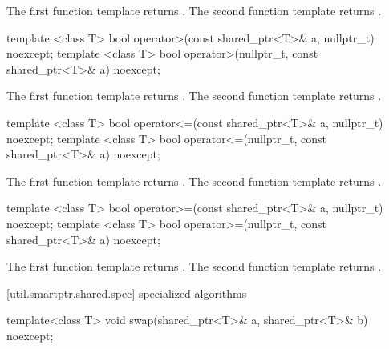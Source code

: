 \begin{itemdescr}
\pnum
\returns
The first function template returns
.
The second function template returns
.
\end{itemdescr}

%
\begin{itemdecl}
template <class T>
  bool operator>(const shared_ptr<T>& a, nullptr_t) noexcept;
template <class T>
  bool operator>(nullptr_t, const shared_ptr<T>& a) noexcept;
\end{itemdecl}

\begin{itemdescr}
\pnum
\returns
The first function template returns .
The second function template returns .
\end{itemdescr}

%
\begin{itemdecl}
template <class T>
  bool operator<=(const shared_ptr<T>& a, nullptr_t) noexcept;
template <class T>
  bool operator<=(nullptr_t, const shared_ptr<T>& a) noexcept;
\end{itemdecl}

\begin{itemdescr}
\pnum
\returns
The first function template returns .
The second function template returns .
\end{itemdescr}

%
\begin{itemdecl}
template <class T>
  bool operator>=(const shared_ptr<T>& a, nullptr_t) noexcept;
template <class T>
  bool operator>=(nullptr_t, const shared_ptr<T>& a) noexcept;
\end{itemdecl}

\begin{itemdescr}
\pnum
\returns
The first function template returns .
The second function template returns .
\end{itemdescr}

[util.smartptr.shared.spec]{ specialized algorithms}

%
\begin{itemdecl}
template<class T>
  void swap(shared_ptr<T>& a, shared_ptr<T>& b) noexcept;
\end{itemdecl}

